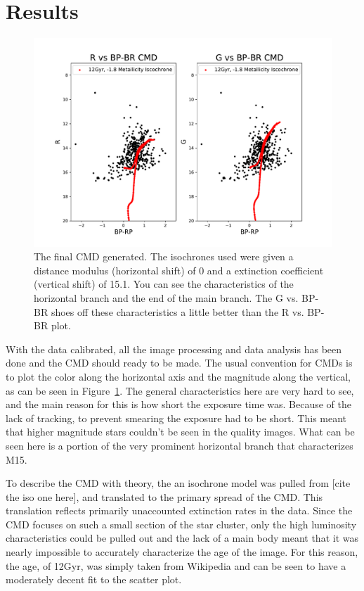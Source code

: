 \documentclass[twoside,11pt]{article}
\begin{document}
\section{Results}
\begin{figure}[ht]
\includegraphics[width=\textwidth]{cmd.pdf}
\caption{The final CMD generated. The isochrones used were given a distance modulus (horizontal shift) of 0 and a extinction coefficient (vertical shift) of 15.1. You can see the characteristics of the horizontal branch and the end of the main branch. The G vs. BP-BR shoes off these characteristics a little better than the R vs. BP-BR plot.}
\label{fig:cmd}
\end{figure}

With the data calibrated, all the image processing and data analysis has been done and the CMD should ready to be made. The usual convention for CMDs is to plot the color along the horizontal axis and the magnitude along the vertical, as can be seen in Figure~\ref{fig:cmd}. The general characteristics here are very hard to see, and the main reason for this is how short the exposure time was. Because of the lack of tracking, to prevent smearing the exposure had to be short. This meant that higher magnitude stars couldn't be seen in the quality images. What can be seen here is a portion of the very prominent horizontal branch that characterizes M15. 

To describe the CMD with theory, the an isochrone model was pulled from [cite the iso one here], and translated to the primary spread of the CMD. This translation reflects primarily unaccounted extinction rates in the data. Since the CMD focuses on such a small section of the star cluster, only the high luminosity characteristics could be pulled out and the lack of a main body meant that it was nearly impossible to accurately characterize the age of the image. For this reason, the age, of 12Gyr, was simply taken from Wikipedia and can be seen to have a moderately decent fit to the scatter plot. 
\end{document}
